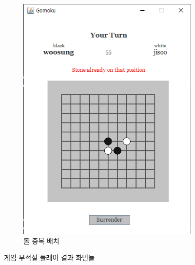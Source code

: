 \documentclass[a4paper, 10pt]{article}
\begin{document}
\begin{figure}[h]
\begin{subfigure}{.3\textwidth}
    \includegraphics[width=.9\linewidth]{resource/already_stone}
    \caption{돌 중복 배치}
    \label{fig:draw}
  \end{subfigure}
  \caption{게임 부적절 플레이 결과 화면들}
\end{figure}
\end{document}
